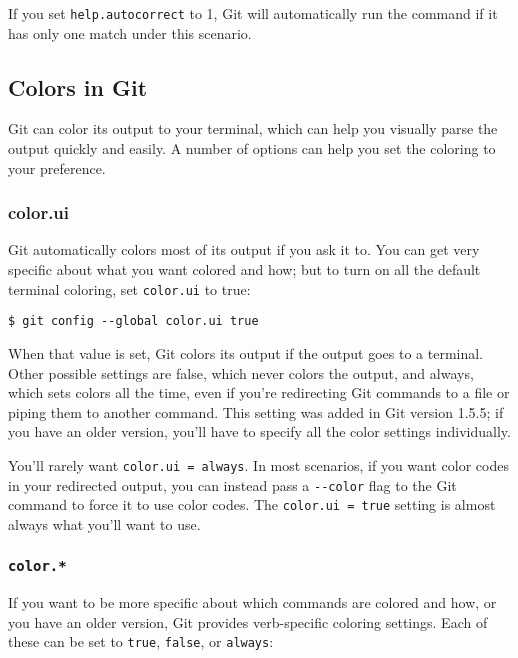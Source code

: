 \documentclass[a4paper]{book}
\begin{document}
If you set \texttt{help.autocorrect} to 1, Git will automatically run the command if it has only one match under this scenario.

\subsection{Colors in Git}

Git can color its output to your terminal, which can help you visually parse the output quickly and easily. A number of options can help you set the coloring to your preference.

\subsubsection{color.ui}

Git automatically colors most of its output if you ask it to. You can get very specific about what you want colored and how; but to turn on all the default terminal coloring, set \texttt{color.ui} to true:

\begin{shaded}\begin{verbatim}
$ git config --global color.ui true
\end{verbatim}\end{shaded}

When that value is set, Git colors its output if the output goes to a terminal. Other possible settings are false, which never colors the output, and always, which sets colors all the time, even if you're redirecting Git commands to a file or piping them to another command. This setting was added in Git version 1.5.5; if you have an older version, you'll have to specify all the color settings individually.

You'll rarely want \texttt{color.ui = always}. In most scenarios, if you want color codes in your redirected output, you can instead pass a \texttt{-{}-color} flag to the Git command to force it to use color codes. The \texttt{color.ui = true} setting is almost always what you'll want to use.

\subsubsection{\texttt{color.*}}

If you want to be more specific about which commands are colored and how, or you have an older version, Git provides verb-specific coloring settings. Each of these can be set to \texttt{true}, \texttt{false}, or \texttt{always}:
\end{document}
